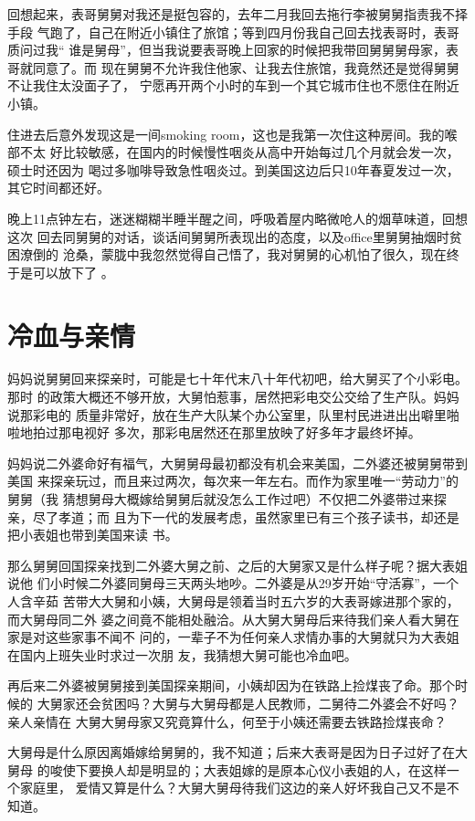 \documentclass[12pt]{book}
\begin{document}
回想起来，表哥舅舅对我还是挺包容的，去年二月我回去拖行李被舅舅指责我不择手段
气跑了，自己在附近小镇住了旅馆；等到四月份我自己回去找表哥时，表哥质问过我“
谁是舅母”，但当我说要表哥晚上回家的时候把我带回舅舅舅母家，表哥就同意了。而
现在舅舅不允许我住他家、让我去住旅馆，我竟然还是觉得舅舅不让我住太没面子了，
宁愿再开两个小时的车到一个其它城市住也不愿住在附近小镇。

住进去后意外发现这是一间smoking room，这也是我第一次住这种房间。我的喉部不太
好比较敏感，在国内的时候慢性咽炎从高中开始每过几个月就会发一次，硕士时还因为
喝过多咖啡导致急性咽炎过。到美国这边后只10年春夏发过一次，其它时间都还好。

晚上11点钟左右，迷迷糊糊半睡半醒之间，呼吸着屋内略微呛人的烟草味道，回想这次
回去同舅舅的对话，谈话间舅舅所表现出的态度，以及office里舅舅抽烟时贫困潦倒的
沧桑，蒙胧中我忽然觉得自己悟了，我对舅舅的心机怕了很久，现在终于是可以放下了
。
\section{冷血与亲情}
\label{sec-9-79}

妈妈说舅舅回来探亲时，可能是七十年代末八十年代初吧，给大舅买了个小彩电。那时
的政策大概还不够开放，大舅怕惹事，居然把彩电交公交给了生产队。妈妈说那彩电的
质量非常好，放在生产大队某个办公室里，队里村民进进出出噼里啪啦地拍过那电视好
多次，那彩电居然还在那里放映了好多年才最终坏掉。

妈妈说二外婆命好有福气，大舅舅母最初都没有机会来美国，二外婆还被舅舅带到美国
来探亲玩过，而且来过两次，每次来一年左右。而作为家里唯一“劳动力”的舅舅（我
猜想舅母大概嫁给舅舅后就没怎么工作过吧）不仅把二外婆带过来探亲，尽了孝道；而
且为下一代的发展考虑，虽然家里已有三个孩子读书，却还是把小表姐也带到美国来读
书。

那么舅舅回国探亲找到二外婆大舅之前、之后的大舅家又是什么样子呢？据大表姐说他
们小时候二外婆同舅母三天两头地吵。二外婆是从29岁开始“守活寡”，一个人含辛茹
苦带大大舅和小姨，大舅母是领着当时五六岁的大表哥嫁进那个家的，而大舅母同二外
婆之间竟不能相处融洽。从大舅大舅母后来待我们亲人看大舅在家是对这些家事不闻不
问的，一辈子不为任何亲人求情办事的大舅就只为大表姐在国内上班失业时求过一次朋
友，我猜想大舅可能也冷血吧。

再后来二外婆被舅舅接到美国探亲期间，小姨却因为在铁路上捡煤丧了命。那个时候的
大舅家还会贫困吗？大舅与大舅母都是人民教师，二舅待二外婆会不好吗？亲人亲情在
大舅大舅母家又究竟算什么，何至于小姨还需要去铁路捡煤丧命？

大舅母是什么原因离婚嫁给舅舅的，我不知道；后来大表哥是因为日子过好了在大舅母
的唆使下要换人却是明显的；大表姐嫁的是原本心仪小表姐的人，在这样一个家庭里，
爱情又算是什么？大舅大舅母待我们这边的亲人好坏我自己又不是不知道。
\end{document}

